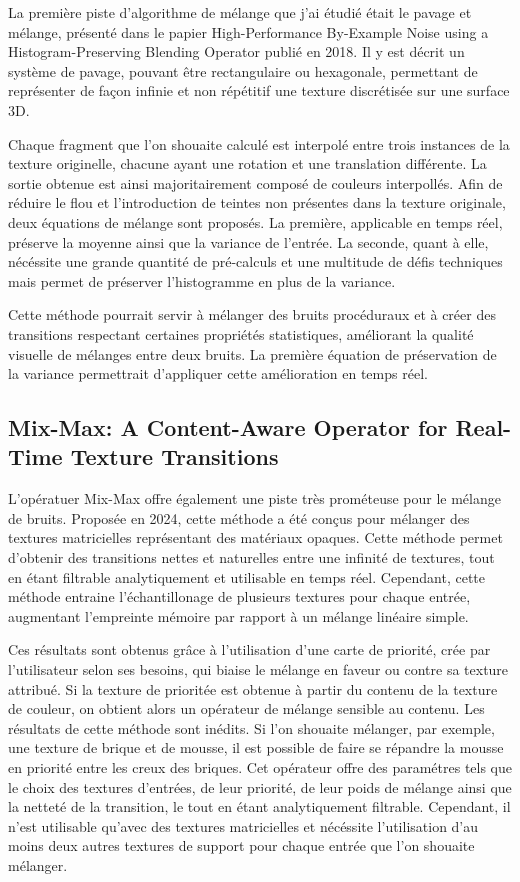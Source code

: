 \documentclass{article}
\begin{document}
La première piste d'algorithme de mélange que j'ai étudié était le pavage et
mélange, présenté dans le papier High-Performance By-Example Noise using a
Histogram-Preserving Blending Operator \cite{HPnoise} publié en 2018. Il y est
décrit un système de pavage, pouvant être rectangulaire ou hexagonale,
permettant de représenter de façon infinie et non répétitif une texture
discrétisée sur une surface 3D.

Chaque fragment que l'on shouaite calculé est interpolé entre trois instances
de la texture originelle, chacune ayant une rotation et une translation
différente. La sortie obtenue est ainsi majoritairement composé de couleurs
interpollés. Afin de réduire le flou et l'introduction de teintes non présentes
dans la texture originale, deux équations de mélange sont proposés. La
première, applicable en temps réel, préserve la moyenne ainsi que la variance
de l'entrée. La seconde, quant à elle, nécéssite une grande quantité de
pré-calculs et une multitude de défis techniques mais permet de préserver
l'histogramme en plus de la variance.

Cette méthode pourrait servir à mélanger des bruits procéduraux et à créer des
transitions respectant certaines propriétés statistiques, améliorant la qualité
visuelle de mélanges entre deux bruits. La première équation de préservation de
la variance permettrait d'appliquer cette amélioration en temps réel.

\subsection{Mix-Max: A Content-Aware Operator for Real-Time Texture Transitions}

L'opératuer Mix-Max \cite{mixmax} offre également une piste très prométeuse
pour le mélange de bruits. Proposée en 2024, cette méthode a été conçus pour
mélanger des textures matricielles représentant des matériaux opaques. Cette
méthode permet d'obtenir des transitions nettes et naturelles entre une
infinité de textures, tout en étant filtrable analytiquement et utilisable en
temps réel. Cependant, cette méthode entraine l'échantillonage de plusieurs
textures pour chaque entrée, augmentant l'empreinte mémoire par rapport à un
mélange linéaire simple.

Ces résultats sont obtenus grâce à l'utilisation d'une carte de priorité, crée
par l'utilisateur selon ses besoins, qui biaise le mélange en faveur ou contre
sa texture attribué. Si la texture de prioritée est obtenue à partir du contenu
de la texture de couleur, on obtient alors un opérateur de mélange sensible au
contenu. Les résultats de cette méthode sont inédits. Si l'on shouaite
mélanger, par exemple, une texture de brique et de mousse, il est possible de
faire se répandre la mousse en priorité entre les creux des briques. Cet
opérateur offre des paramétres tels que le choix des textures d'entrées, de
leur priorité, de leur poids de mélange ainsi que la netteté de la transition,
le tout en étant analytiquement filtrable. Cependant, il n'est utilisable
qu'avec des textures matricielles et nécéssite l'utilisation d'au moins deux
autres textures de support pour chaque entrée que l'on shouaite mélanger.
\end{document}
